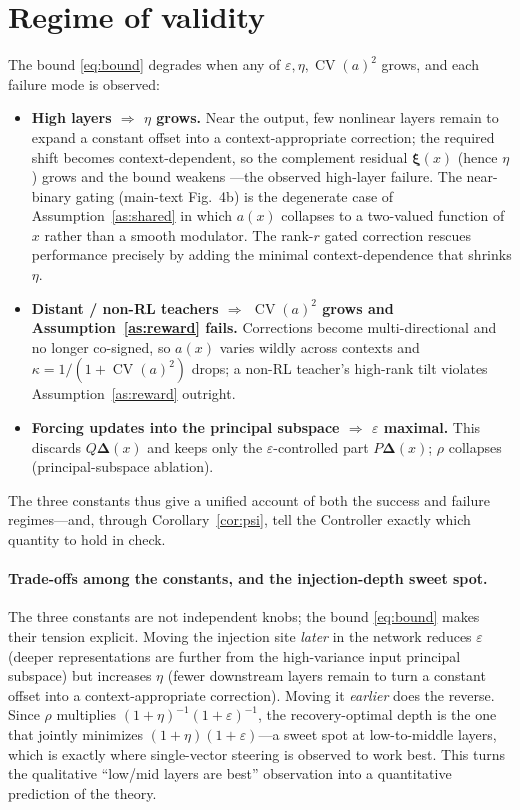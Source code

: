 \documentclass[11pt]{article}
\DeclareMathOperator{\CV}{CV}
\newcommand{\bDelta}{\bm{\Delta}}
\newcommand{\bxi}{\bm{\xi}}
\begin{document}
\section{Regime of validity}\label{sec:validity}
The bound \eqref{eq:bound} degrades when any of $\varepsilon,\eta,\CV(a)^2$ grows, and each failure
mode is observed:
\begin{itemize}[leftmargin=1.4em,itemsep=2pt]
\item \textbf{High layers $\Rightarrow$ $\eta$ grows.} Near the output, few nonlinear layers remain
to expand a constant offset into a context-appropriate correction; the required shift becomes
context-dependent, so the complement residual $\bxi(x)$ (hence $\eta$) grows and the bound weakens
---the observed high-layer failure. The near-binary gating (main-text Fig.~4b) is the degenerate
case of Assumption~\ref{as:shared} in which $a(x)$ collapses to a two-valued function of $x$ rather
than a smooth modulator. The rank-$r$ gated correction rescues performance precisely by adding the
minimal context-dependence that shrinks $\eta$.
\item \textbf{Distant / non-RL teachers $\Rightarrow$ $\CV(a)^2$ grows and
Assumption~\ref{as:reward} fails.} Corrections become multi-directional and no longer co-signed, so
$a(x)$ varies wildly across contexts and $\kappa=1/(1+\CV(a)^2)$ drops; a non-RL teacher's high-rank
tilt violates Assumption~\ref{as:reward} outright.
\item \textbf{Forcing updates into the principal subspace $\Rightarrow$ $\varepsilon$ maximal.}
This discards $Q\bDelta(x)$ and keeps only the $\varepsilon$-controlled part $P\bDelta(x)$; $\rho$
collapses (principal-subspace ablation).
\end{itemize}
The three constants thus give a unified account of both the success and failure regimes---and,
through Corollary~\ref{cor:psi}, tell the Controller exactly which quantity to hold in check.

\paragraph{Trade-offs among the constants, and the injection-depth sweet spot.}
The three constants are not independent knobs; the bound \eqref{eq:bound} makes their tension
explicit. Moving the injection site \emph{later} in the network reduces $\varepsilon$ (deeper
representations are further from the high-variance input principal subspace) but increases $\eta$
(fewer downstream layers remain to turn a constant offset into a context-appropriate correction).
Moving it \emph{earlier} does the reverse. Since $\rho$ multiplies $(1+\eta)^{-1}(1+\varepsilon)^{-1}$,
the recovery-optimal depth is the one that jointly minimizes $(1+\eta)(1+\varepsilon)$---a sweet spot
at low-to-middle layers, which is exactly where single-vector steering is observed to work best.
This turns the qualitative ``low/mid layers are best'' observation into a quantitative prediction of
the theory.
\end{document}
